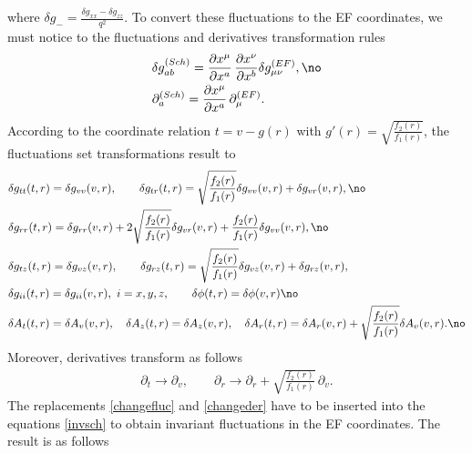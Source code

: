 \documentclass[preprintnumbers,aps,prd,longbibliography,nofootinbib,nobibnotes,amsmath,amssymb]{revtex4}
\begin{document}
where $\delta g_- = \frac{\delta g_{x x} - \delta g_{z z}}{q^2}$. To convert these fluctuations to the EF coordinates, we must  notice to the fluctuations and derivatives transformation rules 
\begin{align}
	&\delta g^{(Sch)}_{a b} = \frac{\partial x^\mu}{\partial x^a}\, \frac{\partial x^\nu}{\partial x^b}\delta g^{(EF)}_{\mu \nu},\no\\
	&\partial_a^{(Sch)} = \frac{\partial x^\mu}{\partial x^a}\,\partial_\mu^{(EF)}.
\end{align} 
According to the coordinate relation $t = v - g(r)$ with $g'(r) = \sqrt{\frac{f_2(r)}{f_1(r)}}$, the fluctuations set transformations result to
\begin{align}\label{changefluc}
	&\delta g_{t t}(t, r) = \delta g_{v v}(v, r), \qquad \delta g_{t r}(t, r) = \sqrt{\frac{f_2(r)}{f_1(r)}} \delta g_{v v}(v, r) + \delta g_{v r}(v, r),\no\\
	&\delta g_{r r}(t, r) = \delta g_{r r}(v, r) + 2 \sqrt{\frac{f_2(r)}{f_1(r)}} \delta g_{v r}(v, r) + \frac{f_2(r)}{f_1(r)}\delta g_{v v}(v, r),\no\\
	&\delta g_{t z}(t, r) = \delta g_{v z}(v, r), \qquad \delta g_{r z}(t, r) = \sqrt{\frac{f_2(r)}{f_1(r)}} \delta g_{v z}(v, r) + \delta g_{r z}(v, r),\\
	& \delta g_{i i}(t, r) = \delta g_{i i}(v, r), \,\, i = x, y, z, \qquad \delta \phi(t, r) = \delta \phi(v, r)\no\\
	& \delta A_t(t, r) = \delta A_v(v, r), \quad \delta A_z(t, r) = \delta A_z(v, r), \quad \delta A_r(t, r) = \delta A_r(v, r) + \sqrt{\frac{f_2(r)}{f_1(r)}} \delta A_{v}(v, r).\no
\end{align}
Moreover, derivatives transform as follows
\begin{align}\label{changeder}
	\partial_t \to \partial_v, \qquad \partial_r \to \partial_r + \sqrt{\frac{f_2(r)}{f_1(r)}} \,\partial_v.
\end{align}
The replacements \eqref{changefluc} and \eqref{changeder} have to be inserted into the equations \eqref{invsch} to obtain invariant fluctuations in the EF coordinates. The result is as follows
\end{document}
